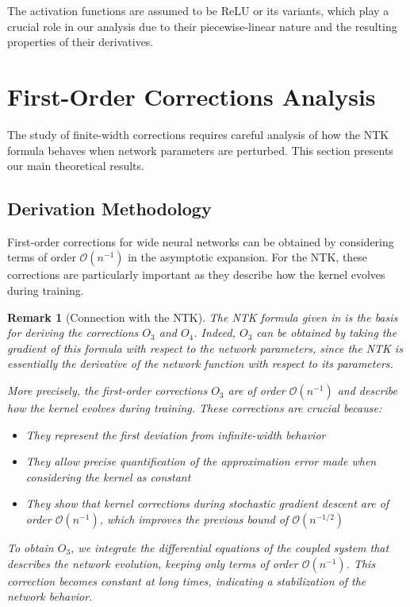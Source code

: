 \documentclass[11pt,a4paper]{article}
\newtheorem{remark}[theorem]{Remark}
\theoremstyle{definition}
\begin{document}
The activation functions are assumed to be ReLU or its variants, which play a crucial role in our analysis due to their piecewise-linear nature and the resulting properties of their derivatives.

\newpage

\section{First-Order Corrections Analysis}

The study of finite-width corrections requires careful analysis of how the NTK formula behaves when network parameters are perturbed. This section presents our main theoretical results.

\subsection{Derivation Methodology}

First-order corrections for wide neural networks can be obtained by considering terms of order $\mathcal{O}(n^{-1})$ in the asymptotic expansion. For the NTK, these corrections are particularly important as they describe how the kernel evolves during training.

\begin{remark}[Connection with the NTK]\label{rem:connection}
The NTK formula given in  is the basis for deriving the corrections $O_3$ and $O_4$. Indeed, $O_3$ can be obtained by taking the gradient of this formula with respect to the network parameters, since the NTK is essentially the derivative of the network function with respect to its parameters.

More precisely, the first-order corrections $O_3$ are of order $\mathcal{O}(n^{-1})$ and describe how the kernel evolves during training. These corrections are crucial because:
\begin{itemize}
\item They represent the first deviation from infinite-width behavior
\item They allow precise quantification of the approximation error made when considering the kernel as constant
\item They show that kernel corrections during stochastic gradient descent are of order $\mathcal{O}(n^{-1})$, which improves the previous bound of $\mathcal{O}(n^{-1/2})$
\end{itemize}

To obtain $O_3$, we integrate the differential equations of the coupled system that describes the network evolution, keeping only terms of order $\mathcal{O}(n^{-1})$. This correction becomes constant at long times, indicating a stabilization of the network behavior.
\end{remark}
\end{document}
